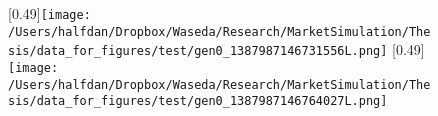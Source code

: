\begin{figure}[0.49\linewidth]{\texttt{[image: /Users/halfdan/Dropbox/Waseda/Research/MarketSimulation/Thesis/data\_for\_figures/test/gen0\_1387987146731556L.png]}}
[0.49\linewidth]{\texttt{[image: /Users/halfdan/Dropbox/Waseda/Research/MarketSimulation/Thesis/data\_for\_figures/test/gen0\_1387987146764027L.png]}} \end{figure}